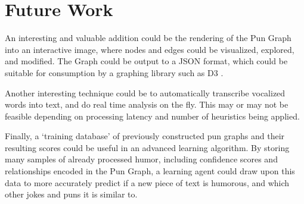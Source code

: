 \section{Future Work}

An interesting and valuable addition could be the rendering of the Pun Graph into an interactive image, where nodes and edges could be visualized, explored, and modified. The Graph could be output to a JSON format, which could be suitable for consumption by a graphing library such as D3 \cite{D3}.

Another interesting technique could be to automatically transcribe vocalized words into text, and do real time analysis on the fly. This may or may not be feasible depending on processing latency and number of heuristics being applied.

Finally, a `training database' of previously constructed pun graphs and their resulting scores could be useful in an advanced learning algorithm. By storing many samples of already processed humor, including confidence scores and relationships encoded in the Pun Graph, a learning agent could draw upon this data to more accurately predict if a new piece of text is humorous, and which other jokes and puns it is similar to.
